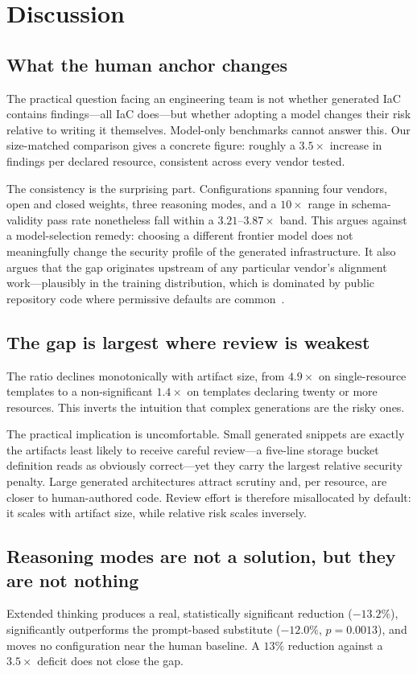 \documentclass[conference]{IEEEtran}
\begin{document}
\section{Discussion}
\label{sec:discussion}

\subsection{What the human anchor changes}
The practical question facing an engineering team is not whether generated IaC
contains findings---all IaC does---but whether adopting a model changes their
risk relative to writing it themselves. Model-only benchmarks cannot answer this.
Our size-matched comparison gives a concrete figure: roughly a $3.5\times$
increase in findings per declared resource, consistent across every vendor
tested.

The consistency is the surprising part. Configurations spanning four vendors,
open and closed weights, three reasoning modes, and a $10\times$ range in
schema-validity pass rate nonetheless fall within a $3.21$--$3.87\times$ band.
This argues against a model-selection remedy: choosing a different frontier model
does not meaningfully change the security profile of the generated
infrastructure. It also argues that the gap originates upstream of any particular
vendor's alignment work---plausibly in the training distribution, which is
dominated by public repository code where permissive defaults are
common~\cite{rahman2019seven}.

\subsection{The gap is largest where review is weakest}
The ratio declines monotonically with artifact size, from $4.9\times$ on
single-resource templates to a non-significant $1.4\times$ on templates declaring
twenty or more resources. This inverts the intuition that complex generations are
the risky ones.

The practical implication is uncomfortable. Small generated snippets are exactly
the artifacts least likely to receive careful review---a five-line storage bucket
definition reads as obviously correct---yet they carry the largest relative
security penalty. Large generated architectures attract scrutiny and, per
resource, are closer to human-authored code. Review effort is therefore
misallocated by default: it scales with artifact size, while relative risk scales
inversely.

\subsection{Reasoning modes are not a solution, but they are not nothing}
Extended thinking produces a real, statistically significant reduction
($-13.2\%$), significantly outperforms the prompt-based substitute
($-12.0\%$, $p=0.0013$), and moves no configuration near the human baseline. A
$13\%$ reduction against a $3.5\times$ deficit does not close the gap.
\end{document}
